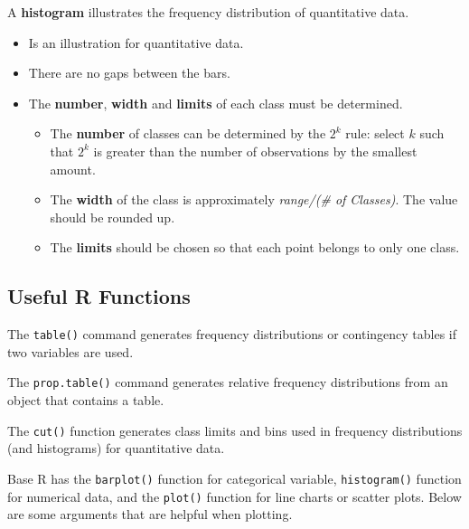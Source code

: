 \documentclass[
  letterpaper,
  DIV=11,
  numbers=noendperiod]{scrreprt}
\providecommand{\tightlist}{%
  \setlength{\itemsep}{0pt}\setlength{\parskip}{0pt}}\usepackage{longtable,booktabs,array}
\begin{document}
A \textbf{histogram} illustrates the frequency distribution of
quantitative data.

\begin{itemize}
\item
  Is an illustration for quantitative data.
\item
  There are no gaps between the bars.
\item
  The \textbf{number}, \textbf{width} and \textbf{limits} of each class
  must be determined.

  \begin{itemize}
  \tightlist
  \item
    The \textbf{number} of classes can be determined by the \(2^k\)
    rule: select \(k\) such that \(2^k\) is greater than the number of
    observations by the smallest amount.
  \item
    The \textbf{width} of the class is approximately \emph{range/(\# of
    Classes)}. The value should be rounded up.
  \item
    The \textbf{limits} should be chosen so that each point belongs to
    only one class.
  \end{itemize}
\end{itemize}

\hypertarget{useful-r-functions-1}{%
\subsection*{Useful R Functions}\label{useful-r-functions-1}}

The \texttt{table()} command generates frequency distributions or
contingency tables if two variables are used.

The \texttt{prop.table()} command generates relative frequency
distributions from an object that contains a table.

The \texttt{cut()} function generates class limits and bins used in
frequency distributions (and histograms) for quantitative data.

Base R has the \texttt{barplot()} function for categorical variable,
\texttt{histogram()} function for numerical data, and the
\texttt{plot()} function for line charts or scatter plots. Below are
some arguments that are helpful when plotting.
\end{document}
